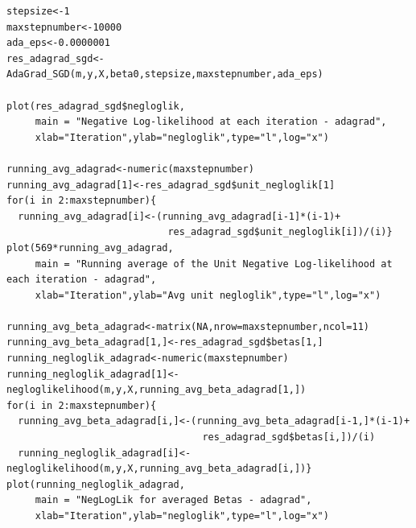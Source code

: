 \documentclass{article}
\begin{document}
\begin{lstlisting}
stepsize<-1
maxstepnumber<-10000
ada_eps<-0.0000001
res_adagrad_sgd<-AdaGrad_SGD(m,y,X,beta0,stepsize,maxstepnumber,ada_eps)

plot(res_adagrad_sgd$negloglik,
     main = "Negative Log-likelihood at each iteration - adagrad",
     xlab="Iteration",ylab="negloglik",type="l",log="x")

running_avg_adagrad<-numeric(maxstepnumber)
running_avg_adagrad[1]<-res_adagrad_sgd$unit_negloglik[1]
for(i in 2:maxstepnumber){
  running_avg_adagrad[i]<-(running_avg_adagrad[i-1]*(i-1)+
  							res_adagrad_sgd$unit_negloglik[i])/(i)}
plot(569*running_avg_adagrad,
     main = "Running average of the Unit Negative Log-likelihood at each iteration - adagrad",
     xlab="Iteration",ylab="Avg unit negloglik",type="l",log="x")

running_avg_beta_adagrad<-matrix(NA,nrow=maxstepnumber,ncol=11)
running_avg_beta_adagrad[1,]<-res_adagrad_sgd$betas[1,]
running_negloglik_adagrad<-numeric(maxstepnumber)
running_negloglik_adagrad[1]<-negloglikelihood(m,y,X,running_avg_beta_adagrad[1,])
for(i in 2:maxstepnumber){
  running_avg_beta_adagrad[i,]<-(running_avg_beta_adagrad[i-1,]*(i-1)+
  								  res_adagrad_sgd$betas[i,])/(i)
  running_negloglik_adagrad[i]<-negloglikelihood(m,y,X,running_avg_beta_adagrad[i,])}
plot(running_negloglik_adagrad,
     main = "NegLogLik for averaged Betas - adagrad",
     xlab="Iteration",ylab="negloglik",type="l",log="x")
\end{lstlisting}
\end{document}
